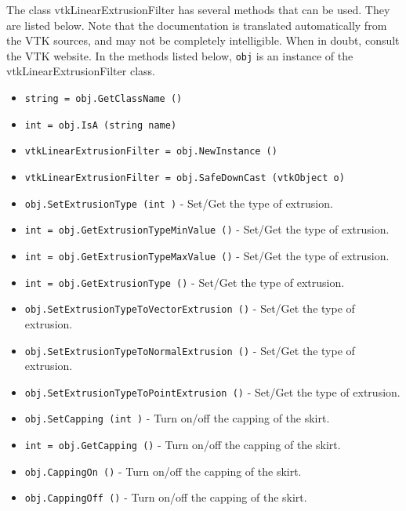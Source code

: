 The class vtkLinearExtrusionFilter has several methods that can be used.
  They are listed below.
Note that the documentation is translated automatically from the VTK sources,
and may not be completely intelligible.  When in doubt, consult the VTK website.
In the methods listed below, \verb|obj| is an instance of the vtkLinearExtrusionFilter class.
\begin{itemize}
\item  \verb|string = obj.GetClassName ()|

\item  \verb|int = obj.IsA (string name)|

\item  \verb|vtkLinearExtrusionFilter = obj.NewInstance ()|

\item  \verb|vtkLinearExtrusionFilter = obj.SafeDownCast (vtkObject o)|

\item  \verb|obj.SetExtrusionType (int )| -  Set/Get the type of extrusion.

\item  \verb|int = obj.GetExtrusionTypeMinValue ()| -  Set/Get the type of extrusion.

\item  \verb|int = obj.GetExtrusionTypeMaxValue ()| -  Set/Get the type of extrusion.

\item  \verb|int = obj.GetExtrusionType ()| -  Set/Get the type of extrusion.

\item  \verb|obj.SetExtrusionTypeToVectorExtrusion ()| -  Set/Get the type of extrusion.

\item  \verb|obj.SetExtrusionTypeToNormalExtrusion ()| -  Set/Get the type of extrusion.

\item  \verb|obj.SetExtrusionTypeToPointExtrusion ()| -  Set/Get the type of extrusion.

\item  \verb|obj.SetCapping (int )| -  Turn on/off the capping of the skirt.

\item  \verb|int = obj.GetCapping ()| -  Turn on/off the capping of the skirt.

\item  \verb|obj.CappingOn ()| -  Turn on/off the capping of the skirt.

\item  \verb|obj.CappingOff ()| -  Turn on/off the capping of the skirt.


\end{itemize}
